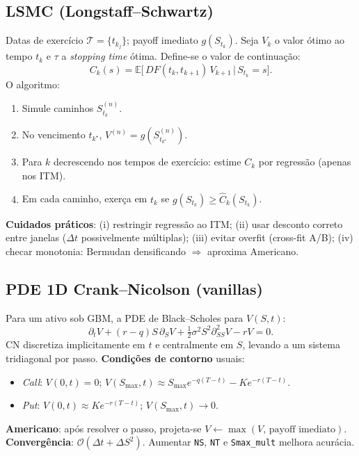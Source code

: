 \documentclass[11pt,a4paper]{article}
\begin{document}
\subsection{LSMC (Longstaff--Schwartz)}
Datas de exercício $\mathcal T=\{t_{k_j}\}$; payoff imediato $g(S_{t_k})$.
Seja $V_k$ o valor ótimo ao tempo $t_k$ e $\tau$ a \emph{stopping time} ótima.
Define-se o valor de continuação:
\[
C_k(s)=\mathbb E\!\big[\,DF(t_k,t_{k+1})\,V_{k+1}\,\big|\,S_{t_k}=s\big].
\]
O algoritmo:
\begin{enumerate}[nosep]
\item Simule caminhos $S^{(n)}_{t_k}$.
\item No vencimento $t_{k^\star}$, $V^{(n)}=g(S^{(n)}_{t_{k^\star}})$.
\item Para $k$ decrescendo nos tempos de exercício: estime $C_k$ por regressão (apenas nos ITM).
\item Em cada caminho, exerça em $t_k$ se $g(S_{t_k})\ge \widehat C_k(S_{t_k})$.
\end{enumerate}
\textbf{Cuidados práticos}: (i) restringir regressão ao ITM; (ii) usar desconto correto entre janelas ($\Delta t$ possivelmente múltiplas); 
(iii) evitar overfit (cross-fit A/B); (iv) checar monotonia: Bermudan densificando $\Rightarrow$ aproxima Americano.

\subsection{PDE 1D Crank--Nicolson (vanillas)}
Para um ativo sob GBM, a PDE de Black--Scholes para $V(S,t)$:
\[
\partial_t V + (r-q)S\,\partial_S V + \tfrac12\sigma^2 S^2 \partial^2_{SS}V - rV = 0.
\]
CN discretiza implicitamente em $t$ e centralmente em $S$, levando a um sistema tridiagonal por passo.
\textbf{Condições de contorno} usuais:
\begin{itemize}[nosep,leftmargin=1.2em]
\item \emph{Call}: $V(0,t)=0$; $V(S_{\max},t)\approx S_{\max}e^{-q(T-t)}-Ke^{-r(T-t)}$.
\item \emph{Put}: $V(0,t)\approx Ke^{-r(T-t)}$; $V(S_{\max},t)\to 0$.
\end{itemize}
\textbf{Americano}: após resolver o passo, projeta-se $V\gets\max(V,\,\text{payoff imediato})$.
\textbf{Convergência}: $\mathcal O(\Delta t + \Delta S^2)$. Aumentar \texttt{NS}, \texttt{NT} e \texttt{Smax\_mult} melhora acurácia.
\end{document}
